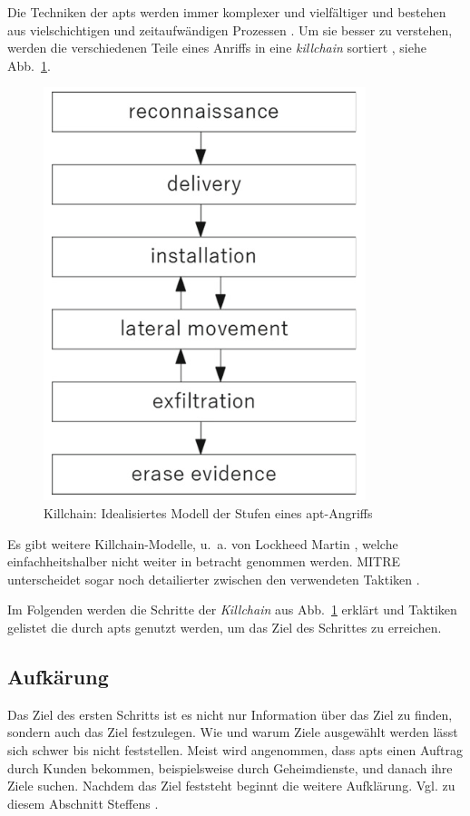 \documentclass[conference]{IEEEtran}
\begin{document}
Die Techniken der \acp{apt} werden immer komplexer und vielfältiger und bestehen aus vielschichtigen und zeitaufwändigen Prozessen \cite[S.~7f]{Steffens2020}.
Um sie besser zu verstehen, werden die verschiedenen Teile eines Anriffs in eine \textit{killchain} sortiert \cite[S.~8]{Steffens2020}, siehe Abb.~\ref{fig.killchain}.
\begin{figure}[htbp]
    \centerline{\includegraphics[scale=0.8]{figures/killchain.png}}
    \caption{Killchain: Idealisiertes Modell der Stufen eines \ac{apt}-Angriffs \cite[S.~8]{Steffens2020}}
    \label{fig.killchain}
\end{figure}
Es gibt weitere Killchain-Modelle, u.~a. von Lockheed Martin \cite{LockheedMartin}, welche einfachheitshalber nicht weiter in betracht genommen werden.
MITRE unterscheidet sogar noch detailierter zwischen den verwendeten Taktiken \cite{MITREEnterpriseTactics}.

Im Folgenden werden die Schritte der \textit{Killchain} aus Abb.~\ref{fig.killchain} erklärt und Taktiken gelistet die durch \acp{apt} genutzt werden, um das Ziel des Schrittes zu erreichen.

\subsection{Aufkärung}

Das Ziel des ersten Schritts ist es nicht nur Information über das Ziel zu finden, sondern auch das Ziel festzulegen.
Wie und warum Ziele ausgewählt werden lässt sich schwer bis nicht feststellen.
Meist wird angenommen, dass \acp{apt} einen Auftrag durch Kunden bekommen, beispielsweise durch Geheimdienste, und danach ihre Ziele suchen.
Nachdem das Ziel feststeht beginnt die weitere Aufklärung.
Vgl. zu diesem Abschnitt Steffens \cite[S.~10ff]{Steffens2020}.
\end{document}
